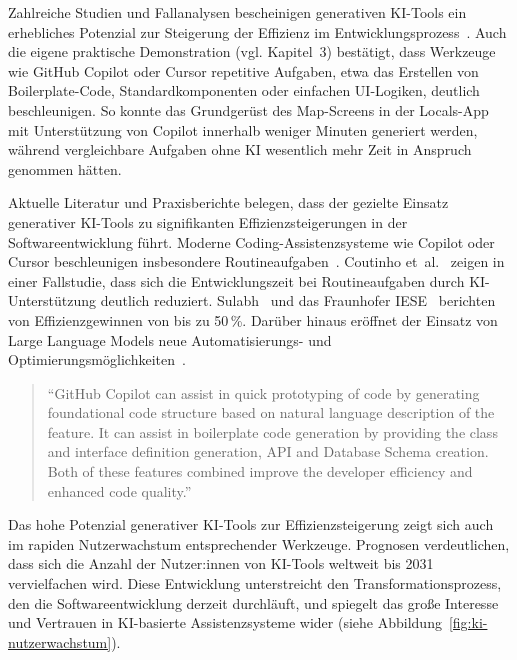 Zahlreiche Studien und Fallanalysen bescheinigen generativen KI-Tools ein
erhebliches Potenzial zur Steigerung der Effizienz im
Entwicklungsprozess~\cite{donvir_role_2024,coutinho_role_2024,s_future_2024,esposito_generative_2025,braun_ki_2024,siebert_generative_2024}.
Auch die eigene praktische Demonstration (vgl. Kapitel~3) bestätigt, dass
Werkzeuge wie GitHub Copilot oder Cursor repetitive Aufgaben, etwa das
Erstellen von Boilerplate-Code, Standardkomponenten oder einfachen UI-Logiken,
deutlich beschleunigen. So konnte das Grundgerüst des Map-Screens in der
Locals-App mit Unterstützung von Copilot innerhalb weniger Minuten generiert
werden, während vergleichbare Aufgaben ohne KI wesentlich mehr Zeit in Anspruch
genommen hätten.

Aktuelle Literatur und Praxisberichte belegen, dass der gezielte Einsatz
generativer KI-Tools zu signifikanten Effizienzsteigerungen in der
Softwareentwicklung führt. Moderne Coding-Assistenzsysteme wie Copilot oder
Cursor beschleunigen insbesondere Routineaufgaben~\cite{donvir_role_2024}.
Coutinho et~al.~\cite{coutinho_role_2024} zeigen in einer Fallstudie, dass sich
die Entwicklungszeit bei Routineaufgaben durch KI-Unterstützung deutlich
reduziert. Sulabh~\cite{s_future_2024} und das Fraunhofer
IESE~\cite{siebert_generative_2024} berichten von Effizienzgewinnen von bis zu
50\,\%. Darüber hinaus eröffnet der Einsatz von Large Language Models neue
Automatisierungs- und
Optimierungsmöglichkeiten~\cite{esposito_generative_2025}.

\begin{quote}
    \enquote{GitHub Copilot can assist in quick prototyping of code by generating foundational code structure based on natural language description of the feature. It can assist in boilerplate code generation by providing the class and interface definition generation, API and Database Schema creation. Both of these features combined improve the developer efficiency and enhanced code quality.}
    \cite[p.~4]{donvir_role_2024}
\end{quote}

Das hohe Potenzial generativer KI-Tools zur Effizienzsteigerung zeigt sich auch
im rapiden Nutzerwachstum entsprechender Werkzeuge. Prognosen verdeutlichen,
dass sich die Anzahl der Nutzer:innen von KI-Tools weltweit bis 2031
vervielfachen wird. Diese Entwicklung unterstreicht den Transformationsprozess,
den die Softwareentwicklung derzeit durchläuft, und spiegelt das große
Interesse und Vertrauen in KI-basierte Assistenzsysteme wider (siehe
Abbildung~\ref{fig:ki-nutzerwachstum}).

